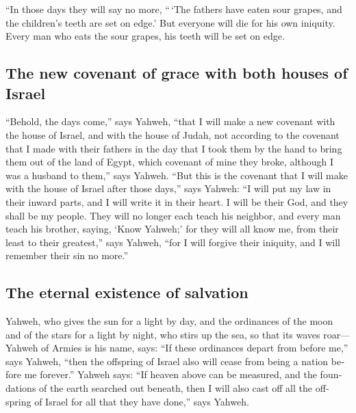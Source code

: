 \begin{paracol}{2}
\begin{otherlanguage}{english}
 ``In those days they will say no more, ``\,`The fathers
have eaten sour grapes, and the children's teeth are set on edge.'
 But everyone will die for his own iniquity. Every man
who eats the sour grapes, his teeth will be set on edge.

\hypertarget{the-new-covenant-of-grace-with-both-houses-of-israel}{%
\subsection{The new covenant of grace with both houses of
Israel}\label{the-new-covenant-of-grace-with-both-houses-of-israel}}

 ``Behold, the days come,'' says Yahweh, ``that I will
make a new covenant with the house of Israel, and with the house of
Judah,  not according to the covenant that I made with
their fathers in the day that I took them by the hand to bring them out
of the land of Egypt, which covenant of mine they broke, although I was
a husband to them,'' says Yahweh.  ``But this is the
covenant that I will make with the house of Israel after those days,''
says Yahweh: ``I will put my law in their inward parts, and I will write
it in their heart. I will be their God, and they shall be my people.
 They will no longer each teach his neighbor, and every
man teach his brother, saying, `Know Yahweh;' for they will all know me,
from their least to their greatest,'' says Yahweh, ``for I will forgive
their iniquity, and I will remember their sin no more.''

\hypertarget{the-eternal-existence-of-salvation}{%
\subsection{The eternal existence of
salvation}\label{the-eternal-existence-of-salvation}}

 Yahweh, who gives the sun for a light by day, and the
ordinances of the moon and of the stars for a light by night, who stirs
up the sea, so that its waves roar--- Yahweh of Armies is his name,
says:  ``If these ordinances depart from before me,''
says Yahweh, ``then the offspring of Israel also will cease from being a
nation before me forever.''  Yahweh says: ``If heaven
above can be measured, and the foundations of the earth searched out
beneath, then I will also cast off all the offspring of Israel for all
that they have done,'' says Yahweh.


\end{otherlanguage}
\end{paracol}
